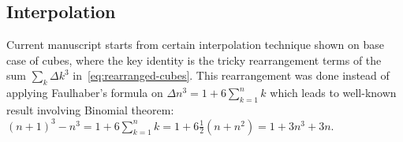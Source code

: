 ﻿\subsection{Interpolation}\label{subsec:interpolation}
Current manuscript starts from certain interpolation technique shown on base case of cubes, where the key
identity is the tricky rearrangement terms of the sum $\sum_k \Delta k^3$ in~\eqref{eq:rearranged-cubes}.
This rearrangement was done instead of applying Faulhaber's formula on $\Delta n^3 = 1 + 6\sum_{k=1}^{n} k$ which
leads to well-known result involving Binomial theorem:
$(n+1)^3 - n^3 = 1 + 6\sum_{k=1}^{n} k = 1 + 6 \frac{1}{2}(n+n^2) = 1 + 3n^3 + 3n$.
